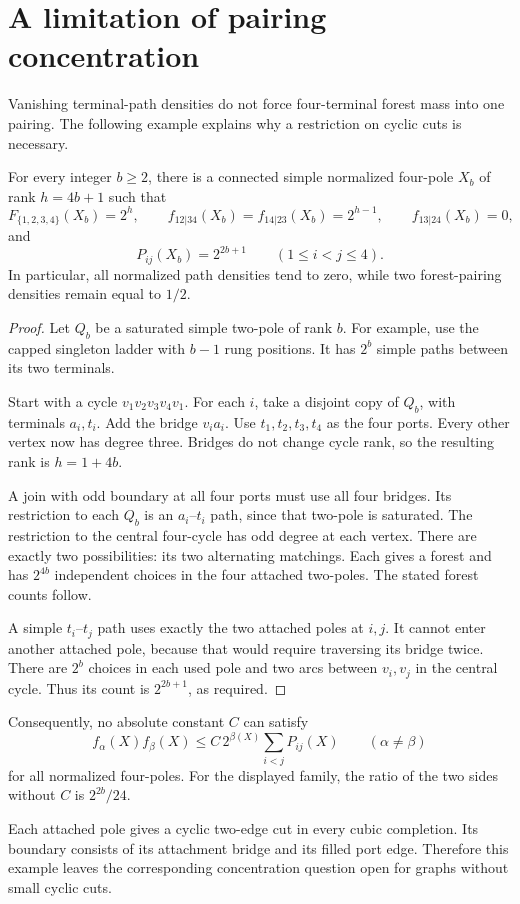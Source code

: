 \section{A limitation of pairing concentration}
\label{sec:random-seven-concentration-counterexample}

Vanishing terminal-path densities do not force four-terminal forest mass into one pairing.
The following example explains why a restriction on cyclic cuts is necessary.

\begin{proposition}
\label{prop:random-seven-concentration-counterexample}
For every integer $b\ge2$, there is a connected simple normalized four-pole $X_b$ of rank $h=4b+1$ such that
\[
 F_{\{1,2,3,4\}}(X_b)=2^h,
 \qquad
 f_{12|34}(X_b)=f_{14|23}(X_b)=2^{h-1},
 \qquad
 f_{13|24}(X_b)=0,
\]
and
\[
 P_{ij}(X_b)=2^{2b+1}
 \qquad(1\le i<j\le4).
\]
In particular, all normalized path densities tend to zero, while two forest-pairing densities remain equal to $1/2$.
\end{proposition}

\begin{proof}
Let $Q_b$ be a saturated simple two-pole of rank $b$.
For example, use the capped singleton ladder with $b-1$ rung positions.
It has $2^b$ simple paths between its two terminals.

Start with a cycle $v_1v_2v_3v_4v_1$.
For each $i$, take a disjoint copy of $Q_b$, with terminals $a_i,t_i$.
Add the bridge $v_ia_i$.
Use $t_1,t_2,t_3,t_4$ as the four ports.
Every other vertex now has degree three.
Bridges do not change cycle rank, so the resulting rank is $h=1+4b$.

A join with odd boundary at all four ports must use all four bridges.
Its restriction to each $Q_b$ is an $a_i$--$t_i$ path, since that two-pole is saturated.
The restriction to the central four-cycle has odd degree at each vertex.
There are exactly two possibilities: its two alternating matchings.
Each gives a forest and has $2^{4b}$ independent choices in the four attached two-poles.
The stated forest counts follow.

A simple $t_i$--$t_j$ path uses exactly the two attached poles at $i,j$.
It cannot enter another attached pole, because that would require traversing its bridge twice.
There are $2^b$ choices in each used pole and two arcs between $v_i,v_j$ in the central cycle.
Thus its count is $2^{2b+1}$, as required.
\end{proof}

Consequently, no absolute constant $C$ can satisfy
\[
 f_\alpha(X)f_\beta(X)
 \le C\,2^{\beta(X)}\sum_{i<j}P_{ij}(X)
 \qquad(\alpha\ne\beta)
\]
for all normalized four-poles.
For the displayed family, the ratio of the two sides without $C$ is $2^{2b}/24$.

Each attached pole gives a cyclic two-edge cut in every cubic completion.
Its boundary consists of its attachment bridge and its filled port edge.
Therefore this example leaves the corresponding concentration question open for graphs without small cyclic cuts.
